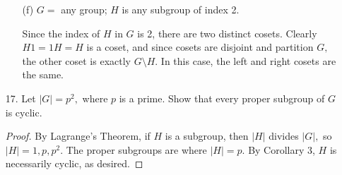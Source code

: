 \documentclass{article}
\begin{document}
\begin{itemize}
\begin{itemize}
			\item[(f)] $G=$ any group; $H$ is any subgroup of index 2.
				\begin{soln}
					Since the index of $H$ in $G$ is 2, there are two distinct cosets. Clearly $H1=1H=H$ is a coset, and since cosets are disjoint and partition $G,$ the other coset is exactly $G\setminus H.$ In this case, the left and right cosets are the same.
					
				\end{soln}
				
		\end{itemize}

	\item[17.] Let $|G|=p^2,$ where $p$ is a prime. Show that every proper subgroup of $G$ is cyclic.
		\begin{proof}
			By Lagrange's Theorem, if $H$ is a subgroup, then $|H|$ divides $|G|,$ so $|H|=1, p, p^2.$ The proper subgroups are where $|H|=p.$ By Corollary 3, $H$ is necessarily cyclic, as desired.
			
		\end{proof}
		
\end{itemize}
\end{document}
